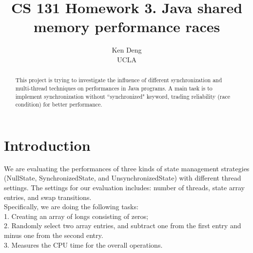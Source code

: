 \documentclass[letterpaper,twocolumn,10pt]{article}
\begin{document}

\date{}

\title{\Large \bf CS 131 Homework 3. Java shared memory performance races}

\author{
{Ken Deng}\\
UCLA
} %

\maketitle

\begin{abstract}
This project is trying to investigate the influence of different
synchronization and multi-thread techniques on performances
in Java programs. A main task is to implement synchronization
without ``synchronized" keyword, trading reliability (race 
condition) for better performance.
\end{abstract}
\section{Introduction}

We are evaluating the performances of three kinds of state 
management strategies (NullState, SynchronizedState, and
UnsynchronizedState) with different thread settings. The 
settings for our evaluation includes: number of threads,
state array entries, and swap transitions.\\

\noindent Specifically, we are doing the following tasks:\\
1. Creating an array of longs consisting of zeros;\\
2. Randomly select two array entries, and subtract one from
the first entry and minus one from the second entry.\\
3. Measures the CPU time for the overall operations.
\end{document}
